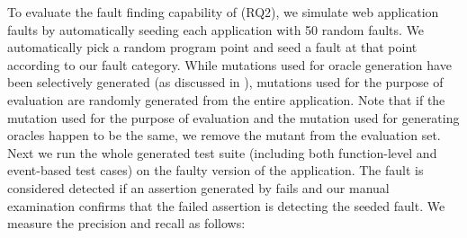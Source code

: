  \label{test-oracle-setup}
%
To evaluate the fault finding capability of \jseft (RQ2), we simulate web application faults by automatically seeding each application with 50 random faults. %
We automatically pick a random program point and seed a fault at that point according to our fault category.
While mutations used for oracle generation have been selectively generated (as discussed in ), 
mutations used for the purpose of evaluation are randomly generated from the entire application. Note that if the mutation used for the purpose of evaluation and the mutation used for generating oracles happen to be the same, we remove the mutant from the evaluation set. 
%
Next we run the whole generated test suite (including both function-level and event-based test cases) on the faulty version of the application. The fault is considered detected if an assertion generated by \jseft fails and our manual examination confirms that the failed assertion is detecting the seeded fault.
We measure the precision and recall as follows:

